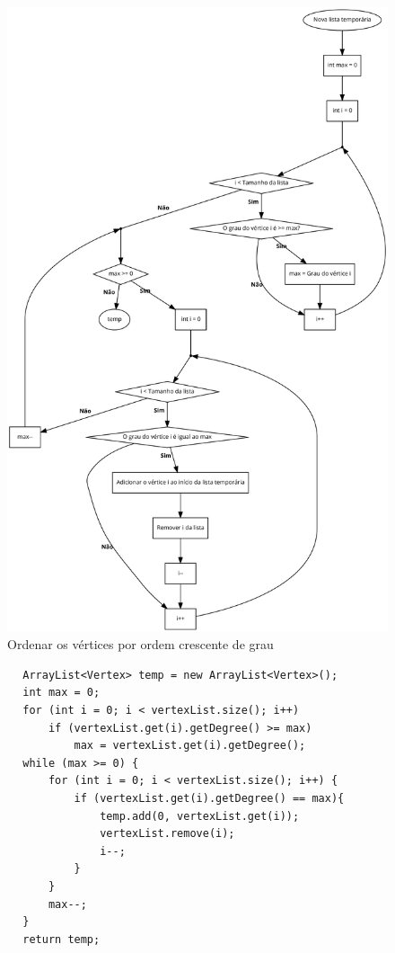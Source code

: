 \documentclass[a4paper,10pt]{report}
\begin{document}
\begin{figure}[H]
    \centering
        \includegraphics[scale=0.18]{img/ordernarVerticesPorGrau.pdf}
    \caption{Ordenar os vértices por ordem crescente de grau}
    \label{fig:ovpg}
\end{figure}

\begin{lstlisting}
        ArrayList<Vertex> temp = new ArrayList<Vertex>();
        int max = 0;
        for (int i = 0; i < vertexList.size(); i++)
            if (vertexList.get(i).getDegree() >= max) 
                max = vertexList.get(i).getDegree();
        while (max >= 0) {
            for (int i = 0; i < vertexList.size(); i++) {
                if (vertexList.get(i).getDegree() == max){
                    temp.add(0, vertexList.get(i));
                    vertexList.remove(i);
                    i--;
                }
            }       
            max--;
        }
        return temp;
\end{lstlisting}
\end{document}
